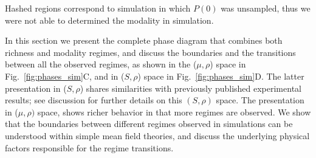 \documentclass[9pt,twocolumn,twoside,lineno]{pnas-new}
\begin{document}
\begin{figure*}[t!]
{    Hashed regions correspond to simulation in which $P(0)$ was unsampled, thus we were not able to determined the modality in simulation. %
    }
    \label{fig:phases_sim}
\end{figure*}

In this section we present the complete phase diagram that combines both richness and modality regimes, and discuss the boundaries and the transitions between all the observed regimes, as shown in the ($\mu,\rho$) space in Fig.~\ref{fig:phases_sim}C, and in ($S,\rho$) space in Fig.~\ref{fig:phases_sim}D. 
The latter presentation in ($S,\rho$) shares similarities with previously published experimental results; see discussion for further details on this $(S,\rho)$ space. 
The presentation in ($\mu,\rho)$ space, shows richer behavior in that more regimes are observed. 
We show that the boundaries between different regimes observed in simulations can be understood within simple mean field theories, and discuss the underlying physical factors responsible for the regime transitions.
\end{document}
